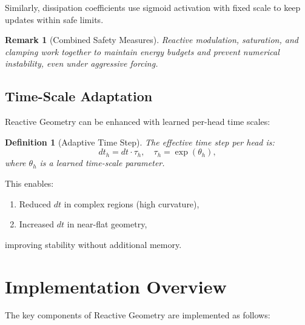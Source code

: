 \documentclass[12pt,letterpaper,twoside]{article}
\newtheorem{definition}{Definition}[section]
\newtheorem{remarque}{Remark}[section]
\begin{document}
Similarly, dissipation coefficients use sigmoid activation with fixed scale to keep updates within safe limits.

\begin{remarque}[Combined Safety Measures]
Reactive modulation, saturation, and clamping work together to maintain energy budgets and prevent numerical instability, even under aggressive forcing.
\end{remarque}

\subsection{Time-Scale Adaptation}

Reactive Geometry can be enhanced with learned per-head time scales:

\begin{definition}[Adaptive Time Step]
The effective time step per head is:
\[
dt_h = dt \cdot \tau_h, \quad \tau_h = \exp(\theta_h),
\]
where $\theta_h$ is a learned time-scale parameter.
\end{definition}

This enables:
\begin{enumerate}
\item Reduced $dt$ in complex regions (high curvature),
\item Increased $dt$ in near-flat geometry,
\end{enumerate}
improving stability without additional memory.

\section{Implementation Overview}

The key components of Reactive Geometry are implemented as follows:
\end{document}
